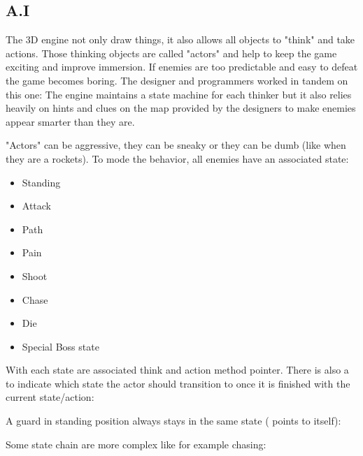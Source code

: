 \subsection{A.I}
The 3D engine not only draw things, it also allows all objects to "think" and take actions. Those thinking objects are called "actors" and help to keep the game exciting and improve immersion. If enemies are too predictable and easy to defeat the game becomes boring. The designer and programmers worked in tandem on this one: The engine maintains a state machine for each thinker but it also relies heavily on hints and clues on the map provided by the designers to make enemies appear smarter than they are.\\
\par







"Actors" can be aggressive, they can be sneaky or they can be dumb (like when they are a rockets). To mode the behavior, all enemies have an associated state:
\begin{itemize}
\item Standing
\item Attack
\item Path
\item Pain
\item Shoot
\item Chase
\item Die
\item Special Boss state
\end{itemize}

With each state are associated think and action method pointer. There is also a  to indicate which state the actor should transition to once it is finished with the current state/action:\\
\par
\begin{minipage}{\textwidth}

\end{minipage}
\par


A guard in standing position always stays in the same state ( points to itself):\\
\par

\begin{minipage}{\textwidth}

\end{minipage}
\par
Some state chain are more complex like for example chasing:\\

